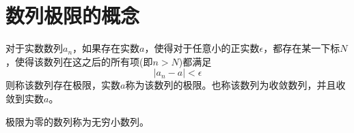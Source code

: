
\section{数列极限的概念}
\label{sec:the-definition-of-sequence-limit}

\begin{definition}
  对于实数数列${a_n}$，如果存在实数$a$，使得对于任意小的正实数$\epsilon$，都存在某一下标$N$，使得该数列在这之后的所有项(即$n>N$)都满足
  \begin{equation}
    \label{eq:the-definition-of-sequence-limit}
    |a_n-a|<\epsilon
  \end{equation}
  则称该数列存在极限，实数$a$称为该数列的极限。也称该数列为收敛数列，并且收敛到实数$a$。
\end{definition}

极限为零的数列称为无穷小数列。

